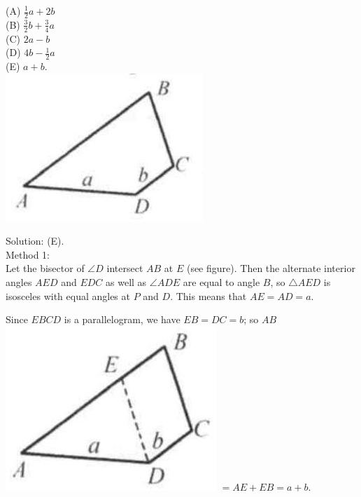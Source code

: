 \documentclass[10pt]{article}
\begin{document}
(A) \(\frac{1}{2} a+2 b\)\\
(B) \(\frac{3}{2} b+\frac{3}{4} a\)\\
(C) \(2 a-b\)\\
(D) \(4 b-\frac{1}{2} a\)\\
(E) \(a+b\).\\
\includegraphics[max width=\textwidth, center]{2025_04_17_97bc1f7e44d93c271a88g-110(3)}

Solution: (E).\\
Method 1:\\
Let the bisector of \(\angle D\) intersect \(A B\) at \(E\) (see figure). Then the alternate interior angles \(A E D\) and \(E D C\) as well as \(\angle A D E\) are equal to angle \(B\), so \(\triangle A E D\) is isosceles with equal angles at \(P\) and \(D\). This means that \(A E=A D=a\).

Since \(E B C D\) is a parallelogram, we have \(E B=D C=b\); so \(A B\)\\
\includegraphics[max width=\textwidth]{2025_04_17_97bc1f7e44d93c271a88g-110(2)} \(=A E+E B=a+b\).
\end{document}
